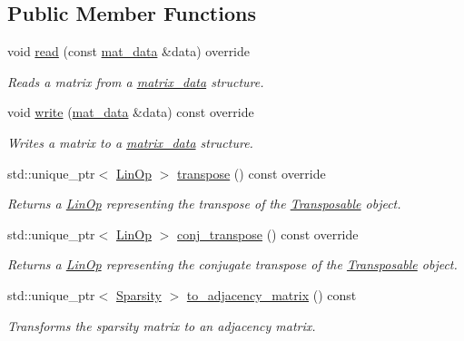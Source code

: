 \subsection*{Public Member Functions}
\begin{DoxyCompactItemize}
\item 
void \hyperlink{classgko_1_1matrix_1_1Sparsity_a9515162e2e6bca7541a0cbcc8f07c48f}{read} (const \hyperlink{structgko_1_1matrix__data}{mat\+\_\+data} \&data) override
\begin{DoxyCompactList}\small\item\em Reads a matrix from a \hyperlink{structgko_1_1matrix__data}{matrix\+\_\+data} structure. \end{DoxyCompactList}\item 
void \hyperlink{classgko_1_1matrix_1_1Sparsity_a19da921c91836bc5a6fc20e3abc5c812}{write} (\hyperlink{structgko_1_1matrix__data}{mat\+\_\+data} \&data) const override
\begin{DoxyCompactList}\small\item\em Writes a matrix to a \hyperlink{structgko_1_1matrix__data}{matrix\+\_\+data} structure. \end{DoxyCompactList}\item 
std\+::unique\+\_\+ptr$<$ \hyperlink{classgko_1_1LinOp}{Lin\+Op} $>$ \hyperlink{classgko_1_1matrix_1_1Sparsity_a524ae904a3a1335fe2d4da8d43541872}{transpose} () const override
\begin{DoxyCompactList}\small\item\em Returns a \hyperlink{classgko_1_1LinOp}{Lin\+Op} representing the transpose of the \hyperlink{classgko_1_1Transposable}{Transposable} object. \end{DoxyCompactList}\item 
std\+::unique\+\_\+ptr$<$ \hyperlink{classgko_1_1LinOp}{Lin\+Op} $>$ \hyperlink{classgko_1_1matrix_1_1Sparsity_ac72ca6ceac90d47fce0816e760d22fd2}{conj\+\_\+transpose} () const override
\begin{DoxyCompactList}\small\item\em Returns a \hyperlink{classgko_1_1LinOp}{Lin\+Op} representing the conjugate transpose of the \hyperlink{classgko_1_1Transposable}{Transposable} object. \end{DoxyCompactList}\item 
std\+::unique\+\_\+ptr$<$ \hyperlink{classgko_1_1matrix_1_1Sparsity}{Sparsity} $>$ \hyperlink{classgko_1_1matrix_1_1Sparsity_a505956075f66c61668295f4b37506bfd}{to\+\_\+adjacency\+\_\+matrix} () const
\begin{DoxyCompactList}\small\item\em Transforms the sparsity matrix to an adjacency matrix. \end{DoxyCompactList}\item 

\end{DoxyCompactItemize}
